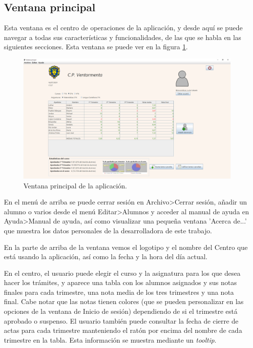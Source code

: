 \subsection{Ventana principal}
Esta ventana es el centro de operaciones de la aplicación, y desde aquí se puede navegar a todas sus características y funcionalidades, de las que se habla en las siguientes secciones. Esta ventana se puede ver en la figura \ref{Fig:ventanaprincipal}.

\begin{figure}[h]
\centering\includegraphics[width=1\linewidth]{figs/ventanaprincipal.png}
\caption{Ventana principal de la aplicación.}
\label{Fig:ventanaprincipal}
\end{figure}

En el menú de arriba se puede cerrar sesión en Archivo>Cerrar sesión, añadir un alumno o varios desde el menú Editar>Alumnos y acceder al manual de ayuda en Ayuda>Manual de ayuda, así como visualizar una pequeña ventana 'Acerca de...' que muestra los datos personales de la desarrolladora de este trabajo.

En la parte de arriba de la ventana vemos el logotipo y el nombre del Centro que está usando la aplicación, así como la fecha y la hora del día actual. 

En el centro, el usuario puede elegir el curso y la asignatura para los que desea hacer los trámites, y aparece una tabla con los alumnos asignados y sus notas finales para cada trimestre, una nota media de los tres trimestres y una nota final. Cabe notar que las notas tienen colores (que se pueden personalizar en las opciones de la ventana de Inicio de sesión) dependiendo de si el trimestre está aprobado o suspenso. El usuario también puede consultar la fecha de cierre de actas para cada trimestre manteniendo el ratón por encima del nombre de cada trimestre en la tabla. Esta información se muestra mediante un \textit{tooltip}.

